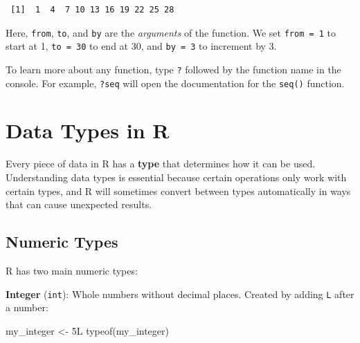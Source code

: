 \documentclass[
  letterpaper,
  DIV=11,
  numbers=noendperiod]{scrreprt}
\newenvironment{Shaded}{\begin{snugshade}}{\end{snugshade}}
\newcommand{\DecValTok}[1]{\textcolor[rgb]{0.68,0.00,0.00}{#1}}
\newcommand{\FunctionTok}[1]{\textcolor[rgb]{0.28,0.35,0.67}{#1}}
\newcommand{\NormalTok}[1]{\textcolor[rgb]{0.00,0.23,0.31}{#1}}
\newcommand{\OtherTok}[1]{\textcolor[rgb]{0.00,0.23,0.31}{#1}}
\begin{document}
\begin{verbatim}
 [1]  1  4  7 10 13 16 19 22 25 28
\end{verbatim}

Here, \texttt{from}, \texttt{to}, and \texttt{by} are the
\emph{arguments} of the function. We set \texttt{from\ =\ 1} to start at
1, \texttt{to\ =\ 30} to end at 30, and \texttt{by\ =\ 3} to increment
by 3.

\begin{tcolorbox}[enhanced jigsaw, arc=.35mm, bottomrule=.15mm, bottomtitle=1mm, breakable, colback=white, colbacktitle=quarto-callout-tip-color!10!white, colframe=quarto-callout-tip-color-frame, coltitle=black, left=2mm, leftrule=.75mm, opacityback=0, opacitybacktitle=0.6, rightrule=.15mm, title=\textcolor{quarto-callout-tip-color}{\faLightbulb}\hspace{0.5em}{Getting Help}, titlerule=0mm, toprule=.15mm, toptitle=1mm]

To learn more about any function, type \texttt{?} followed by the
function name in the console. For example, \texttt{?seq} will open the
documentation for the \texttt{seq()} function.

\end{tcolorbox}

\section{Data Types in R}\label{data-types-in-r}

Every piece of data in R has a \textbf{type} that determines how it can
be used. Understanding data types is essential because certain
operations only work with certain types, and R will sometimes convert
between types automatically in ways that can cause unexpected results.

\subsection{Numeric Types}\label{numeric-types}

R has two main numeric types:

\textbf{Integer} (\texttt{int}): Whole numbers without decimal places.
Created by adding \texttt{L} after a number:

\begin{Shaded}
\begin{Highlighting}[]
\NormalTok{my\_integer }\OtherTok{\textless{}{-}} \DecValTok{5}\NormalTok{L}
\FunctionTok{typeof}\NormalTok{(my\_integer)}
\end{Highlighting}
\end{Shaded}
\end{document}
